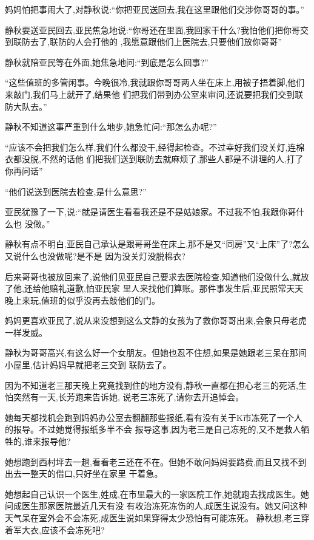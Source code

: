 ﻿\documentclass[12pt]{article}
\begin{document}
妈妈怕把事闹大了,对静秋说:``你把亚民送回去,我在这里跟他们交涉你哥哥的事。''

静秋要送亚民回去,亚民焦急地说:``你哥还在里面,我回家干什么?我怕他们把你哥交到联防去了,联防的人会打他的
\myrule ,我愿意跟他们上医院去,只要他们放你哥哥\myrule ''

静秋就陪亚民等在外面,她焦急地问:``到底是怎么回事?''

``这些值班的多管闲事。今晚很冷,我就跟你哥哥两人坐在床上,用被子捂着脚,他们来敲门,我们马上就开了,结果他
们把我们带到办公室来审问,还说要把我们交到联防大队去。''

静秋不知道这事严重到什么地步,她急忙问:``那\myrule 怎么办呢?''

``应该不会把我们怎么样,我们什么都没干,经得起检查。不过幸好我们没关灯,连棉衣都没脱,不然的话\myrule 他
们把我们送到联防去就麻烦了\myrule ,那些人都是不讲理的人,打了你再问话\myrule ''

``他们说送到医院去检查,是什么意思?''

亚民犹豫了一下,说:``就是请医生看看我\myrule 还是不是\myrule 姑娘家\myrule 。不过我不怕,我跟你哥什么也
没做。''

静秋有点不明白,亚民自己承认是跟哥哥坐在床上,那不是又``同房''又``上床''了?怎么又说什么也没做呢?是不是
因为没关灯没脱棉衣?

后来哥哥也被放回来了,说他们见亚民自己要求去医院检查,知道他们没做什么,就放了他,还给他赔礼道歉,怕亚民家
里人来找他们算账。那件事发生后,亚民照常天天晚上来玩,值班的似乎没再去敲他们的门。

妈妈更喜欢亚民了,说从来没想到这么文静的女孩为了救你哥哥出来,会象只母老虎一样发威。

静秋为哥哥高兴,有这么好一个女朋友。但她也忍不住想,如果是她跟老三呆在那间小屋里,估计妈妈早就把老三交到
联防去了。

因为不知道老三那天晚上究竟找到住的地方没有,静秋一直都在担心老三的死活,生怕突然有一天,长芳跑来告诉她,
说老三冻死了,请你去开追悼会。

她每天都找机会跑到妈妈办公室去翻翻那些报纸,看有没有关于K市冻死了一个人的报导。不过她觉得报纸多半不会
报导这事,因为老三是自己冻死的,又不是救人牺牲的,谁来报导他?

她想跑到西村坪去一趟,看看老三还在不在。但她不敢问妈妈要路费,而且又找不到出去一整天的借口,只好坐在家里
干着急。

她想起自己认识一个医生,姓成,在市里最大的一家医院工作,她就跑去找成医生。她问成医生那家医院最近几天有没
有收治冻死冻伤的人,成医生说没有。她又问这种天气呆在室外会不会冻死,成医生说如果穿得太少恐怕有可能冻死。
静秋想,老三穿着军大衣,应该不会冻死吧?
\end{document}
